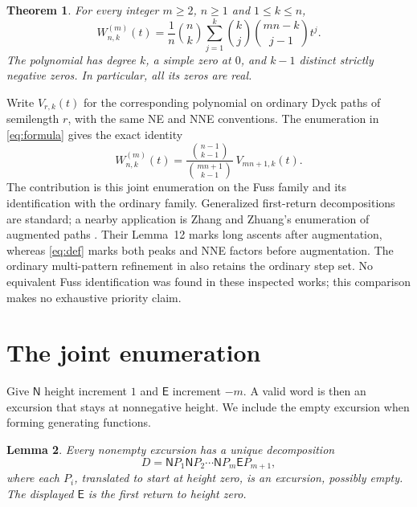 \documentclass[11pt]{article}
\newtheorem{theorem}{Theorem}
\newtheorem{lemma}[theorem]{Lemma}
\newcommand{\N}{\mathsf{N}}
\newcommand{\E}{\mathsf{E}}
\newcommand{\W}{W^{(m)}_{n,k}}
\begin{document}
\begin{theorem}\label{thm:main}
For every integer $m\geq2$, $n\geq1$ and $1\leq k\leq n$,
\begin{equation}\label{eq:formula}
 \W(t)=\frac{1}{n}\binom nk
       \sum_{j=1}^{k}\binom kj\binom{mn-k}{j-1}t^j.
\end{equation}
The polynomial has degree $k$, a simple zero at $0$, and $k-1$ distinct
strictly negative zeros. In particular, all its zeros are real.
\end{theorem}

Write $V_{r,k}(t)$ for the corresponding polynomial on ordinary Dyck
paths of semilength $r$, with the same NE and NNE conventions. The
enumeration in \eqref{eq:formula} gives the exact identity
\begin{equation}\label{eq:ordinary}
 \W(t)=\frac{\binom{n-1}{k-1}}{\binom{mn+1}{k-1}}\,V_{mn+1,k}(t).
\end{equation}
The contribution is this joint enumeration on the Fuss family and its
identification with the ordinary family. Generalized first-return
decompositions are standard; a nearby application is Zhang and Zhuang's
enumeration of augmented paths \cite{ZhangZhuang2024}. Their Lemma~12
marks long ascents after augmentation, whereas \eqref{eq:def} marks both
peaks and NNE factors before augmentation. The ordinary multi-pattern
refinement in \cite[Theorem~5]{BonaEtAl2025} also retains the ordinary
step set. No equivalent Fuss identification was found in these inspected
works; this comparison makes no exhaustive priority claim.

\section{The joint enumeration}

Give $\N$ height increment $1$ and $\E$ increment $-m$. A valid word
is then an excursion that stays at nonnegative height. We include the
empty excursion when forming generating functions.

\begin{lemma}\label{lem:split}
Every nonempty excursion has a unique decomposition
\begin{equation}\label{eq:split}
 D=\N P_1\N P_2\cdots\N P_m\E P_{m+1},
\end{equation}
where each $P_i$, translated to start at height zero, is an excursion,
possibly empty. The displayed $\E$ is the first return to height zero.
\end{lemma}
\end{document}
